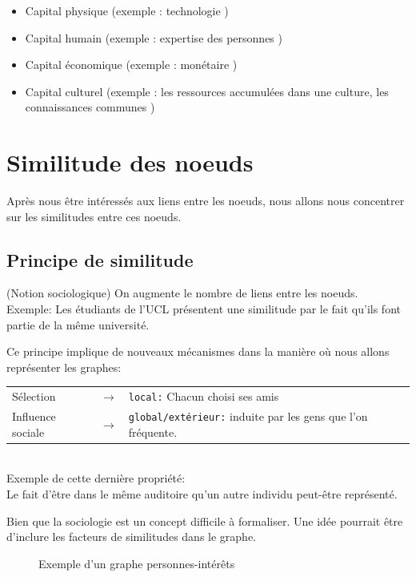 \begin{itemize}
\item Capital physique (exemple : technologie ) 
\item Capital humain (exemple : expertise des personnes )
\item Capital économique (exemple : monétaire ) 
\item Capital culturel (exemple : les ressources accumulées dans une culture, les connaissances communes )
\end{itemize}

\section{Similitude des noeuds}
Après nous être intéressés aux liens entre les noeuds, nous allons nous concentrer sur les similitudes entre  ces noeuds. 

\subsection{Principe de similitude}
(Notion sociologique) On augmente le nombre de liens entre les noeuds. \\
Exemple: Les étudiants de l'UCL présentent une similitude par le fait qu'ils font partie de la même université. 

Ce principe implique de nouveaux mécanismes dans la manière où nous allons représenter les graphes:\\

\begin{tabular}{lcp{7cm}}
Sélection & $\longrightarrow$ & \texttt{local:} Chacun choisi ses amis \\
Influence sociale & $\longrightarrow$ & \texttt{global/extérieur:} induite par les gens que l'on fréquente.
\end{tabular} \\

Exemple de cette dernière propriété:\\ Le fait d'être dans le même auditoire qu'un autre individu peut-être représenté.

Bien que la sociologie est un concept difficile à formaliser. 
Une idée pourrait être d'inclure les facteurs de similitudes dans le graphe.

\begin{figure}[!h]
\centering
{}
\caption{Exemple d'un graphe personnes-intérêts}

\label{graph:graphe3-1}
\end{figure}



